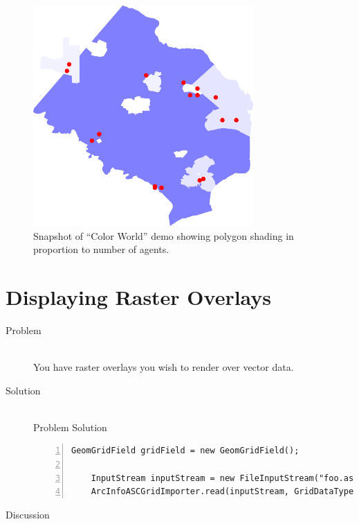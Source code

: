 \documentclass[twoside,10pt]{book}
\begin{document}
\begin{description}
\begin{figure}[ht]
  \centering
  \includegraphics[width=0.75\textwidth]{ColorWorld.pdf}
  \caption{Snapshot of ``Color World'' demo showing polygon shading in
    proportion to number of agents.}
  \label{fig:colorworld}
\end{figure}

\end{description}



\section{Displaying Raster Overlays}
\label{sec:displayingrasteroverlays}

\begin{description}
\item[Problem]~\\
You have raster overlays you wish to render over vector data.

\item[Solution]~\\
Problem Solution
\begin{Verbatim}[frame=lines,framesep=5mm,numbers=left,commandchars=+\[\]]
	GeomGridField gridField = new GeomGridField();
	
	InputStream inputStream = new FileInputStream("foo.asc");
	ArcInfoASCGridImporter.read(inputStream, GridDataType.INTEGER, gridField);
\end{Verbatim}

\item[Discussion ]
\end{description}
\end{document}
